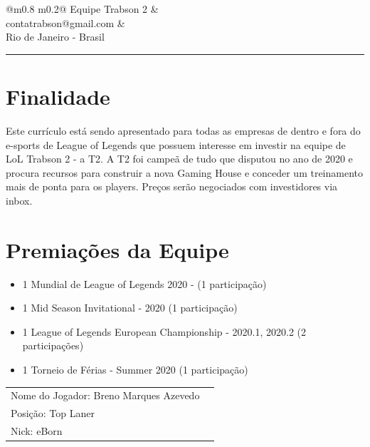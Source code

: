 
\begin{tabularx}{\linewidth}{@{}m{0.8\textwidth} m{0.2\textwidth}@{}}
	\Large{Equipe Trabson 2} &  \\
	\small{contatrabson@gmail.com} & \\
	Rio de Janeiro - Brasil
\end{tabularx}

\textcolor{mygray}{\rule{\textwidth}{1pt}}

\section*{Finalidade}
Este currículo está sendo apresentado para todas as empresas de dentro e fora do e-sports de League of Legends\cite{khawli} que possuem interesse em investir na equipe de LoL Trabson 2 - a T2. A T2 foi campeã de tudo que disputou no ano de 2020 e procura recursos para construir a nova Gaming House e conceder um treinamento mais de ponta para os players. Preços serão negociados com investidores via inbox.

\section*{Premiações da Equipe}
\begin{itemize}
	\item 1 Mundial de League of Legends 2020 - (1 participação)
	\item 1 Mid Season Invitational - 2020 (1 participação)
	\item 1 League of Legends European Championship - 2020.1, 2020.2 (2 participações)
	\item 1 Torneio de Férias - Summer 2020 (1 participação)
\end{itemize}
\newpage

\begin{tabularx}{\linewidth}{@{}m{} m{}@{}}
	\large{Nome do Jogador: Breno Marques Azevedo} \\
	\large{Posição: Top Laner}\\
	\large{Nick: eBorn}
\end{tabularx}

